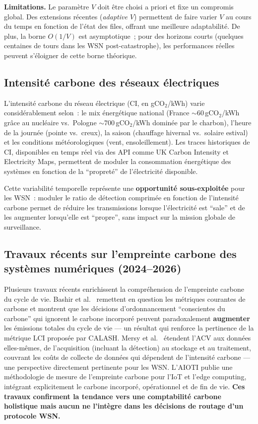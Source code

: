 \textbf{Limitations.} Le paramètre $V$ doit être choisi a priori et fixe un compromis global. Des extensions récentes (\emph{adaptive $V$}) permettent de faire varier $V$ au cours du temps en fonction de l'état des files, offrant une meilleure adaptabilité. De plus, la borne $O(1/V)$ est asymptotique~; pour des horizons courts (quelques centaines de tours dans les WSN post-catastrophe), les performances réelles peuvent s'éloigner de cette borne théorique.

\subsection{Intensité carbone des réseaux électriques}

L'intensité carbone du réseau électrique (CI, en gCO$_2$/kWh) varie considérablement selon~: le mix énergétique national (France $\sim$60\,gCO$_2$/kWh grâce au nucléaire vs.\ Pologne $\sim$700\,gCO$_2$/kWh dominée par le charbon), l'heure de la journée (pointe vs.\ creux), la saison (chauffage hivernal vs.\ solaire estival) et les conditions météorologiques (vent, ensoleillement). Les traces historiques de CI, disponibles en temps réel via des API comme UK Carbon Intensity \cite{uk_carbon_api,carbon_signals_acm2025} et Electricity Maps, permettent de moduler la consommation énergétique des systèmes en fonction de la ``propreté'' de l'électricité disponible.

Cette variabilité temporelle représente une \textbf{opportunité sous-exploitée} pour les WSN~: moduler le ratio de détection comprimée en fonction de l'intensité carbone permet de réduire les transmissions lorsque l'électricité est ``sale'' et de les augmenter lorsqu'elle est ``propre'', sans impact sur la mission globale de surveillance.

\subsection{Travaux récents sur l'empreinte carbone des systèmes numériques (2024--2026)}

Plusieurs travaux récents enrichissent la compréhension de l'empreinte carbone du cycle de vie. Bashir et al.\ \cite{bashir2024sunk} remettent en question les métriques courantes de carbone et montrent que les décisions d'ordonnancement ``conscientes du carbone'' qui ignorent le carbone incorporé peuvent paradoxalement \textbf{augmenter} les émissions totales du cycle de vie --- un résultat qui renforce la pertinence de la métrique LCI proposée par CALASH. Mersy et al.\ \cite{mersy2025lca_data} étendent l'ACV aux données elles-mêmes, de l'acquisition (incluant la détection) au stockage et au traitement, couvrant les coûts de collecte de données qui dépendent de l'intensité carbone --- une perspective directement pertinente pour les WSN. L'AIOTI \cite{aioti2024carbon} publie une méthodologie de mesure de l'empreinte carbone pour l'IoT et l'edge computing, intégrant explicitement le carbone incorporé, opérationnel et de fin de vie. \textbf{Ces travaux confirment la tendance vers une comptabilité carbone holistique mais aucun ne l'intègre dans les décisions de routage d'un protocole WSN.}

